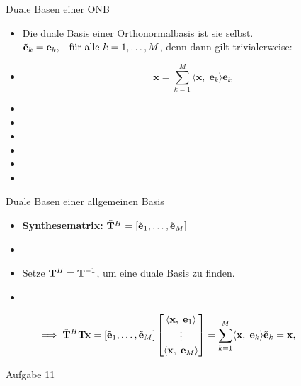 \documentclass[14pt, aspectratio=169, handout]{beamer}
\begin{document}
\begin{frame}{Duale Basen einer ONB}
    \begin{itemize}
        \item Die duale Basis einer Orthonormalbasis ist sie selbst. $\Tilde{\mathbf{e}}_k = \mathbf{e}_k, \hspace{5pt} \text{ für alle } k=1, \dots, M$, denn dann gilt trivialerweise:
        \item[] $$\mathbf{x} = \sum_{k=1}^M \langle \mathbf{x}, \; \mathbf{e}_k \rangle \mathbf{e}_k$$
        \item[] 
        \item[] 
        \item[] 
        \item[] 
        \item[] 
        \item[] 
    \end{itemize}
\end{frame}

\begin{frame}{Duale Basen einer allgemeinen Basis}
    \begin{itemize}
        \item \textbf{Synthesematrix:} $\Tilde{\mathbf{T}}^H = \left[\Tilde{\mathbf{e}}_1, \dots,\Tilde{\mathbf{e}}_M \right]$
        \item[] 
        \item Setze $\Tilde{\mathbf{T}}^H = \mathbf{T}^{-1}$, um eine duale Basis zu finden.
        \item[] 
    \end{itemize}
    $$\hspace{-1cm}\implies \Tilde{\mathbf{T}}^H \mathbf{T} \mathbf{x} = \left[\Tilde{\mathbf{e}}_1, \dots,\Tilde{\mathbf{e}}_M \right] \begin{bmatrix}
        \langle \mathbf{x}, \; \mathbf{e}_1 \rangle \\
        \vdots \\
        \langle \mathbf{x}, \; \mathbf{e}_M \rangle
    \end{bmatrix} = \sum_{k=1}^M \langle \mathbf{x}, \; \mathbf{e}_k \rangle \Tilde{\mathbf{e}}_k = \mathbf{x}, \hspace{5pt}$$
\end{frame}

\begin{frame}{Aufgabe 11}
    
\end{frame}
\end{document}
